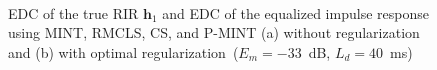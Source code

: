 \documentclass[10pt]{IEEEtran}
\begin{document}
\begin{figure}[t]
\centering
\hbox{\hspace{-0.5cm}
}
\caption{EDC of the true RIR $\mathbf{h}_1$ and EDC of the equalized impulse response using MINT, RMCLS, CS, and P-MINT (a) without regularization and (b) with optimal regularization~($E_m = -33$~dB, $L_d = 40$~ms)}
\end{figure}
\end{document}
